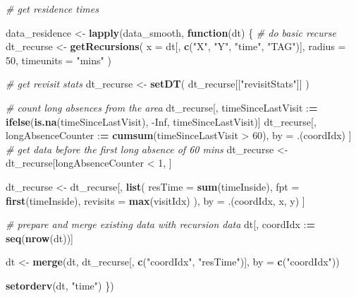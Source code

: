 \documentclass[
]{scrreprt}
\newenvironment{Shaded}{}{}
\newcommand{\CommentTok}[1]{\textcolor[rgb]{0.38,0.63,0.69}{\textit{#1}}}
\newcommand{\ControlFlowTok}[1]{\textcolor[rgb]{0.00,0.44,0.13}{\textbf{#1}}}
\newcommand{\DataTypeTok}[1]{\textcolor[rgb]{0.56,0.13,0.00}{#1}}
\newcommand{\DecValTok}[1]{\textcolor[rgb]{0.25,0.63,0.44}{#1}}
\newcommand{\ErrorTok}[1]{\textcolor[rgb]{1.00,0.00,0.00}{\textbf{#1}}}
\newcommand{\KeywordTok}[1]{\textcolor[rgb]{0.00,0.44,0.13}{\textbf{#1}}}
\newcommand{\NormalTok}[1]{#1}
\newcommand{\OperatorTok}[1]{\textcolor[rgb]{0.40,0.40,0.40}{#1}}
\newcommand{\OtherTok}[1]{\textcolor[rgb]{0.00,0.44,0.13}{#1}}
\newcommand{\StringTok}[1]{\textcolor[rgb]{0.25,0.44,0.63}{#1}}
\begin{document}
\begin{Shaded}
\begin{Highlighting}[]
\CommentTok{\# get residence times}

\NormalTok{data\_residence <{-}}\StringTok{ }\KeywordTok{lapply}\NormalTok{(data\_smooth, }\ControlFlowTok{function}\NormalTok{(dt) \{}
  \CommentTok{\# do basic recurse}
\NormalTok{  dt\_recurse <{-}}\StringTok{ }\KeywordTok{getRecursions}\NormalTok{(}
    \DataTypeTok{x =}\NormalTok{ dt[, }\KeywordTok{c}\NormalTok{(}\StringTok{"X"}\NormalTok{, }\StringTok{"Y"}\NormalTok{, }\StringTok{"time"}\NormalTok{, }\StringTok{"TAG"}\NormalTok{)],}
    \DataTypeTok{radius =} \DecValTok{50}\NormalTok{,}
    \DataTypeTok{timeunits =} \StringTok{"mins"}
\NormalTok{  )}
  
  \CommentTok{\# get revisit stats}
\NormalTok{  dt\_recurse <{-}}\StringTok{ }\KeywordTok{setDT}\NormalTok{(}
\NormalTok{    dt\_recurse[[}\StringTok{"revisitStats"}\NormalTok{]]}
\NormalTok{  )}
  
  \CommentTok{\# count long absences from the area}
\NormalTok{  dt\_recurse[, timeSinceLastVisit }\OperatorTok{:}\ErrorTok{=}
\StringTok{          }\KeywordTok{ifelse}\NormalTok{(}\KeywordTok{is.na}\NormalTok{(timeSinceLastVisit), }\OperatorTok{{-}}\OtherTok{Inf}\NormalTok{, timeSinceLastVisit)]}
\NormalTok{  dt\_recurse[, longAbsenceCounter }\OperatorTok{:}\ErrorTok{=}\StringTok{ }\KeywordTok{cumsum}\NormalTok{(timeSinceLastVisit }\OperatorTok{>}\StringTok{ }\DecValTok{60}\NormalTok{),}
\NormalTok{             by =}\StringTok{ }\NormalTok{.(coordIdx)}
\NormalTok{             ]}
  \CommentTok{\# get data before the first long absence of 60 mins}
\NormalTok{  dt\_recurse <{-}}\StringTok{ }\NormalTok{dt\_recurse[longAbsenceCounter }\OperatorTok{<}\StringTok{ }\DecValTok{1}\NormalTok{, ]}
  
\NormalTok{  dt\_recurse <{-}}\StringTok{ }\NormalTok{dt\_recurse[, }\KeywordTok{list}\NormalTok{(}
    \DataTypeTok{resTime =} \KeywordTok{sum}\NormalTok{(timeInside),}
    \DataTypeTok{fpt =} \KeywordTok{first}\NormalTok{(timeInside),}
    \DataTypeTok{revisits =} \KeywordTok{max}\NormalTok{(visitIdx)}
\NormalTok{  ),}
\NormalTok{  by =}\StringTok{ }\NormalTok{.(coordIdx, x, y)}
\NormalTok{  ]}
  
  \CommentTok{\# prepare and merge existing data with recursion data}
\NormalTok{  dt[, coordIdx }\OperatorTok{:}\ErrorTok{=}\StringTok{ }\KeywordTok{seq}\NormalTok{(}\KeywordTok{nrow}\NormalTok{(dt))]}
  
\NormalTok{  dt <{-}}\StringTok{ }\KeywordTok{merge}\NormalTok{(dt, }
\NormalTok{              dt\_recurse[, }\KeywordTok{c}\NormalTok{(}\StringTok{"coordIdx"}\NormalTok{, }\StringTok{"resTime"}\NormalTok{)], }
              \DataTypeTok{by =} \KeywordTok{c}\NormalTok{(}\StringTok{"coordIdx"}\NormalTok{))}
  
  \KeywordTok{setorderv}\NormalTok{(dt, }\StringTok{"time"}\NormalTok{)}
\NormalTok{\})}
\end{Highlighting}
\end{Shaded}
\end{document}
